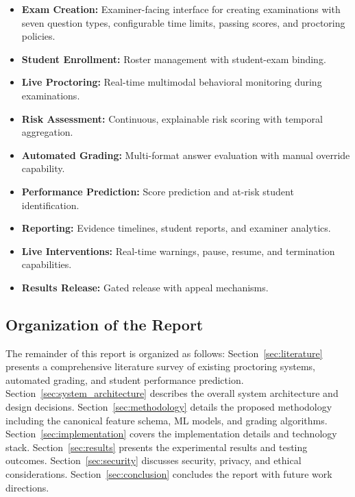 \documentclass{article}
\begin{document}
\begin{itemize}
    \item \textbf{Exam Creation:} Examiner-facing interface for creating examinations with seven question types, configurable time limits, passing scores, and proctoring policies.
    \item \textbf{Student Enrollment:} Roster management with student-exam binding.
    \item \textbf{Live Proctoring:} Real-time multimodal behavioral monitoring during examinations.
    \item \textbf{Risk Assessment:} Continuous, explainable risk scoring with temporal aggregation.
    \item \textbf{Automated Grading:} Multi-format answer evaluation with manual override capability.
    \item \textbf{Performance Prediction:} Score prediction and at-risk student identification.
    \item \textbf{Reporting:} Evidence timelines, student reports, and examiner analytics.
    \item \textbf{Live Interventions:} Real-time warnings, pause, resume, and termination capabilities.
    \item \textbf{Results Release:} Gated release with appeal mechanisms.
\end{itemize}

\subsection{Organization of the Report}

The remainder of this report is organized as follows: Section~\ref{sec:literature} presents a comprehensive literature survey of existing proctoring systems, automated grading, and student performance prediction. Section~\ref{sec:system_architecture} describes the overall system architecture and design decisions. Section~\ref{sec:methodology} details the proposed methodology including the canonical feature schema, ML models, and grading algorithms. Section~\ref{sec:implementation} covers the implementation details and technology stack. Section~\ref{sec:results} presents the experimental results and testing outcomes. Section~\ref{sec:security} discusses security, privacy, and ethical considerations. Section~\ref{sec:conclusion} concludes the report with future work directions.

\end{document}
